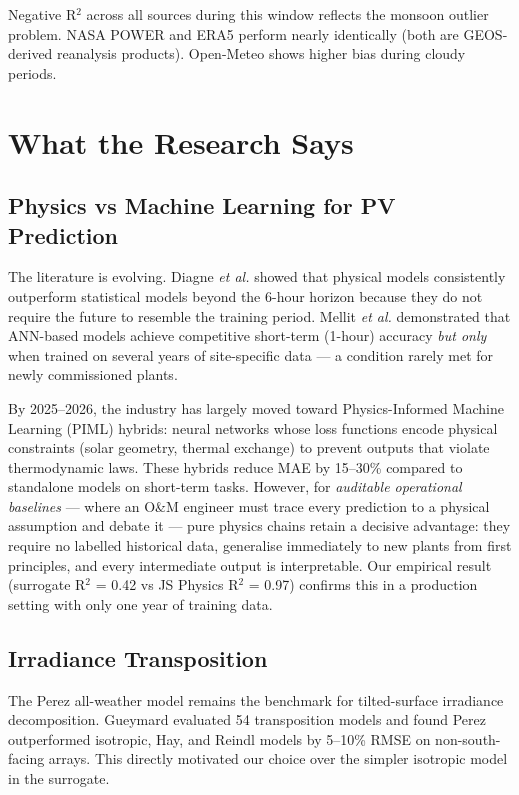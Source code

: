 \documentclass[11pt, a4paper]{article}
\begin{document}
Negative R$^2$ across all sources during this window reflects the monsoon
outlier problem. NASA POWER and ERA5 perform nearly identically (both are
GEOS-derived reanalysis products). Open-Meteo shows higher bias during cloudy
periods.

\section{What the Research Says}

\subsection{Physics vs Machine Learning for PV Prediction}

The literature is evolving. Diagne \textit{et al.} \cite{diagne2013review}
showed that physical models consistently outperform statistical models beyond
the 6-hour horizon because they do not require the future to resemble the
training period. Mellit \textit{et al.} \cite{mellit2010artificial} demonstrated
that ANN-based models achieve competitive short-term (1-hour) accuracy
\emph{but only} when trained on several years of site-specific data --- a
condition rarely met for newly commissioned plants.

By 2025--2026, the industry has largely moved toward Physics-Informed Machine
Learning (PIML) hybrids: neural networks whose loss functions encode physical
constraints (solar geometry, thermal exchange) to prevent outputs that violate
thermodynamic laws. These hybrids reduce MAE by 15--30\% compared to standalone
models on short-term tasks. However, for \emph{auditable operational baselines}
--- where an O\&M engineer must trace every prediction to a physical assumption
and debate it --- pure physics chains retain a decisive advantage: they require
no labelled historical data, generalise immediately to new plants from first
principles, and every intermediate output is interpretable. Our empirical result
(surrogate R$^2$ = 0.42 vs JS Physics R$^2$ = 0.97) confirms this in a
production setting with only one year of training data.

\subsection{Irradiance Transposition}

The Perez all-weather model \cite{perez1990set} remains the benchmark for
tilted-surface irradiance decomposition. Gueymard \cite{gueymard2009direct}
evaluated 54 transposition models and found Perez outperformed isotropic, Hay,
and Reindl models by 5--10\% RMSE on non-south-facing arrays. This directly
motivated our choice over the simpler isotropic model in the surrogate.
\end{document}
